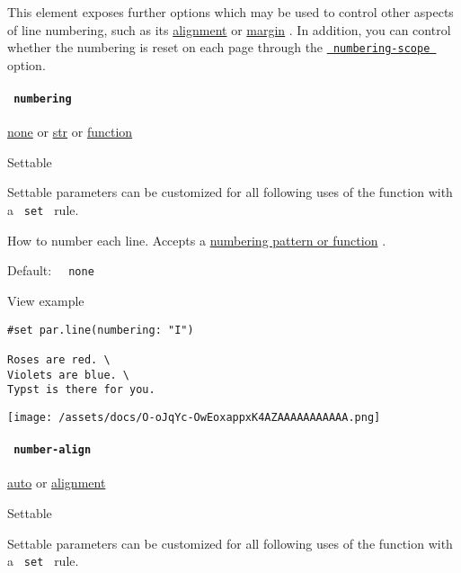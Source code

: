 This element exposes further options which may be used to control other
aspects of line numbering, such as its
\href{/docs/reference/model/par/\#definitions-line-number-align}{alignment}
or
\href{/docs/reference/model/par/\#definitions-line-number-margin}{margin}
. In addition, you can control whether the numbering is reset on each
page through the
\href{/docs/reference/model/par/\#definitions-line-numbering-scope}{\texttt{\ numbering-scope\ }}
option.

\paragraph{\texorpdfstring{\texttt{\ numbering\ }}{ numbering }}\label{definitions-line-numbering}

\href{/docs/reference/foundations/none/}{none} {or}
\href{/docs/reference/foundations/str/}{str} {or}
\href{/docs/reference/foundations/function/}{function}

{{ Settable }}

\label{definitions-line-numbering-settable-tooltip}
Settable parameters can be customized for all following uses of the
function with a \texttt{\ set\ } rule.

How to number each line. Accepts a
\href{/docs/reference/model/numbering/}{numbering pattern or function} .

Default: \texttt{\ }{\texttt{\ none\ }}\texttt{\ }


View example

\begin{verbatim}
#set par.line(numbering: "I")

Roses are red. \
Violets are blue. \
Typst is there for you.
\end{verbatim}

\texttt{[image: /assets/docs/O-oJqYc-OwEoxappxK4AZAAAAAAAAAAA.png]}

\paragraph{\texorpdfstring{\texttt{\ number-align\ }}{ number-align }}\label{definitions-line-number-align}

\href{/docs/reference/foundations/auto/}{auto} {or}
\href{/docs/reference/layout/alignment/}{alignment}

{{ Settable }}

\label{definitions-line-number-align-settable-tooltip}
Settable parameters can be customized for all following uses of the
function with a \texttt{\ set\ } rule.

